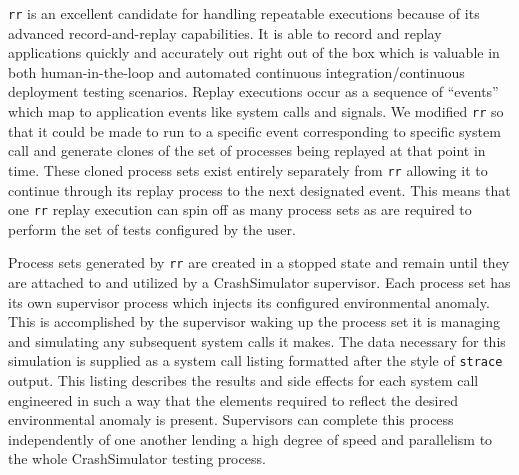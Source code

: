 {\tt rr} is an excellent candidate for handling repeatable executions
because of its advanced record-and-replay capabilities.  It is able to
record and replay applications quickly and accurately out right out of the
box which is valuable in both human-in-the-loop and automated
continuous integration/continuous deployment testing scenarios.  Replay
executions occur as a sequence of ``events'' which map to application
events like system calls and signals.  We modified {\tt rr} so that it
could be made to run to a specific event corresponding to specific system
call and generate clones of the set of processes being replayed at that
point in time.  These cloned process sets exist entirely separately from
{\tt rr} allowing it to continue through its replay process to the next
designated event.  This means that one {\tt rr} replay execution can spin
off as many process sets as are required to perform the set of tests
configured by the user.

Process sets generated by {\tt rr} are created in a stopped state and
remain until they are attached to and utilized by a CrashSimulator
supervisor.  Each process set has its own supervisor process which injects
its configured environmental anomaly.  This is accomplished by the
supervisor waking up the process set it is managing and simulating any
subsequent system calls it makes.  The data necessary for this
simulation is
supplied as a system call listing formatted after the style of {\tt strace}
output. This listing describes the results and side effects for each system
call engineered in such a way that the elements required to reflect the
desired environmental anomaly is present.  Supervisors can complete this
process independently of one another lending a high degree of speed and
parallelism to the whole CrashSimulator testing process.
